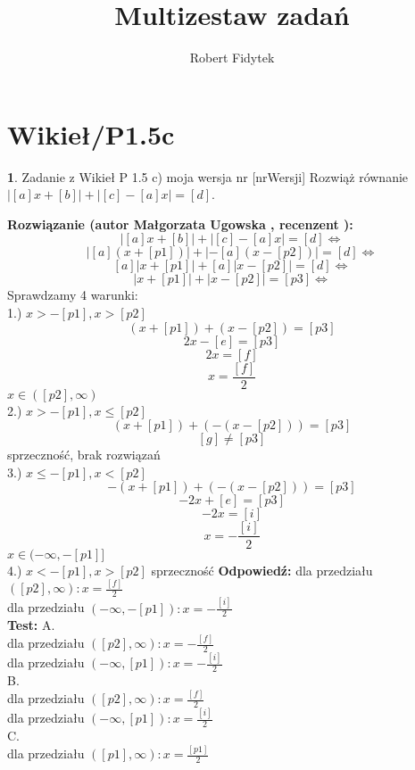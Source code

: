 \documentclass[12pt, a4paper]{article}
\title{Multizestaw zadań}
\author{Robert Fidytek}
\date{}
\theoremstyle{definition} %
\newtheorem{zad}{}
\newcommand{\kategoria}[1]{\section{#1}} %
\newcommand{\zadStart}[1]{\begin{zad}#1\newline} %
\newcommand{\zadStop}{\end{zad}}   %
\newcommand{\rozwStart}[2]{\noindent \textbf{Rozwiązanie (autor #1 , recenzent #2): }\newline} %
\newcommand{\rozwStop}{\newline}                                            %
\newcommand{\odpStart}{\noindent \textbf{Odpowiedź:}\newline}    %
\newcommand{\odpStop}{\newline}                                             %
\newcommand{\testStart}{\noindent \textbf{Test:}\newline} %
\begin{document}
\maketitle


\kategoria{Wikieł/P1.5c}
\zadStart{Zadanie z Wikieł P 1.5 c) moja wersja nr [nrWersji]}
Rozwiąż równanie $|[a]x + [b]| + |[c] - [a]x| = [d]$.
\zadStop
\rozwStart{Małgorzata Ugowska}{}
$$|[a]x + [b]| + |[c] - [a]x| = [d] \Leftrightarrow$$ 
$$|[a](x + [p1])| + |-[a](x - [p2])| = [d] \Leftrightarrow$$
$$[a]|x + [p1]| + [a]|x - [p2]| = [d] \Leftrightarrow$$
$$|x + [p1]| + |x - [p2]| = [p3] \Leftrightarrow$$
Sprawdzamy 4 warunki:\\
1.) $ x > -[p1], x > [p2]$\\
$$ (x + [p1]) + (x - [p2]) = [p3] $$
$$ 2x - [e] = [p3] $$
$$ 2x  = [f] $$
$$ x  = \frac{[f]}{2} $$
$x \in ([p2],\infty)$\\
2.) $ x > -[p1], x \leq [p2]$\\
$$ (x + [p1]) + (-(x - [p2])) = [p3] $$
$$ [g] \ne [p3] $$
sprzeczno\'sć, brak rozwiązań\\
3.) $ x \leq -[p1], x < [p2]$\\
$$ -(x + [p1]) + (-(x - [p2])) = [p3] $$
$$ -2x + [e] = [p3] $$
$$ -2x  = [i] $$
$$ x  = -\frac{[i]}{2} $$
$x \in (-\infty,-[p1]]$\\
4.) $ x < -[p1], x > [p2]$ sprzeczno\'sć
\rozwStop
\odpStart
dla przedziału $([p2],\infty):  x  = \frac{[f]}{2} $\\
dla przedziału $(-\infty,-[p1]):  x  = -\frac{[i]}{2} $\\
\odpStop
\testStart
A.\\
dla przedziału $([p2],\infty):  x  = -\frac{[f]}{2} $\\
dla przedziału $(-\infty,[p1]):  x  = -\frac{[i]}{2} $\\
B.\\
dla przedziału $([p2],\infty):  x  = \frac{[f]}{2} $\\
dla przedziału $(-\infty,[p1]):  x  = \frac{[i]}{2} $\\
C.\\
dla przedziału $([p1],\infty):  x  = \frac{[p1]}{2} $\\
\end{document}
